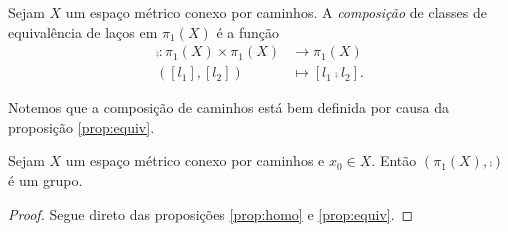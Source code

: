 \begin{definition}
	Sejam $X$ um espaço métrico conexo por caminhos. A \emph{composição} de classes de equivalência de laços em $\pi_1(X)$ é a função
	\begin{align*}
	\comp : \pi_1(X) \times \pi_1(X) &\to \pi_1(X) \\
				([l_1],[l_2]) &\mapsto [l_1 \comp l_2].
	\end{align*}
\end{definition}

Notemos que a composição de caminhos está bem definida por causa da proposição \ref{prop:equiv}.

\begin{theorem}
	Sejam $X$ um espaço métrico conexo por caminhos e $x_0 \in X$. Então  $(\pi_1(X),\comp)$ é um grupo.	
\end{theorem}
\begin{proof}
	Segue direto das proposições  \ref{prop:homo} e \ref{prop:equiv}.
\end{proof}

